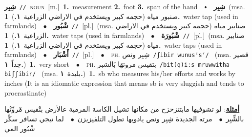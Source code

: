 \documentclass[10pt,a4paper,twoside]{article} %
\begin{document}
\begin{multicols}{2}
{\setlength\topsep{0pt}\textbf{\foreignlanguage{arabic}{شِبِر}}\ {\color{gray}\texttt{//}\color{black}}\ \textsc{noun}\ [m.]\ \textbf{1.}~measurement  \textbf{2.}~foot  \textbf{3.}~span of the hand\ \ $\smblkdiamond$\ \ \setlength\topsep{0pt}\textbf{\foreignlanguage{arabic}{شِبِر}}\ \color{gray}(msa. \foreignlanguage{arabic}{صنبور مياه (حجمه كبير ويستخدم في الاراضي الزراعية}~\foreignlanguage{arabic}{\textbf{١.}})\color{black}\ \textbf{1.}~water tap (used in farmlands)\ \ $\bullet$\ \ \setlength\topsep{0pt}\textbf{\foreignlanguage{arabic}{شْبُور}}\ {\color{gray}\texttt{//}\color{black}}\ [pl.]\ \color{gray}(msa. \foreignlanguage{arabic}{صنابير مياه (حجمه كبير ويستخدم في الاراضي الزراعية}~\foreignlanguage{arabic}{\textbf{١.}})\color{black}\ \textbf{1.}~water taps (used in farmlands)\ \ $\bullet$\ \ \setlength\topsep{0pt}\textbf{\foreignlanguage{arabic}{شْبُورَة}}\ {\color{gray}\texttt{//}\color{black}}\ [pl.]\ \color{gray}(msa. \foreignlanguage{arabic}{صنابير مياه (حجمه كبير ويستخدم في الاراضي الزراعية}~\foreignlanguage{arabic}{\textbf{١.}})\color{black}\ \textbf{1.}~water taps (used in farmlands)\ \ $\bullet$\ \ \setlength\topsep{0pt}\textbf{\foreignlanguage{arabic}{أَشْبَار}}\ {\color{gray}\texttt{//}\color{black}}\ [pl.]\ \ $\bullet$\ \ \textsc{ph.} \color{gray} \foreignlanguage{arabic}{شِبِر ونص}\color{black}\ {\color{gray}\texttt{/{\sffamily ʃibir wunusˤsˤ}/}\color{black}}\ \color{gray} (msa. \foreignlanguage{arabic}{قصير جداً}~\foreignlanguage{arabic}{\textbf{١.}})\color{black}\ \textbf{1.}~very short\ \ $\bullet$\ \ \textsc{ph.} \color{gray} \foreignlanguage{arabic}{بتقيس مروتهَا بَالشبر}\color{black}\ {\color{gray}\texttt{/{\sffamily bit(q)iːs mruwwitha biʃʃibir}/}\color{black}}\ \color{gray} (msa. \foreignlanguage{arabic}{بليدة}~\foreignlanguage{arabic}{\textbf{١.}})\color{black}\ \textbf{1.}~sb who measures his/her efforts and works by inches (It is an idiomatic expression that means sb is very sluggish and tends to procrastinate)\  \begin{flushright}\color{gray}\foreignlanguage{arabic}{\textbf{\underline{\foreignlanguage{arabic}{أمثلة}}}: لو تشوفيها مابتتزحزح من مكانها تشيل الكاسة المرمية عالأرض بتْقيس مْروِّتْها بالشِّبِر\ $\bullet$\ \  مرته الجديدة شِبِر ونص يادوبها تطول التلفيزيزن\ $\bullet$\ \  لما تيجي تسافر سكِّر شْبُور المي}\end{flushright}\color{black}} \vspace{2mm}


\end{multicols}
\end{document}
